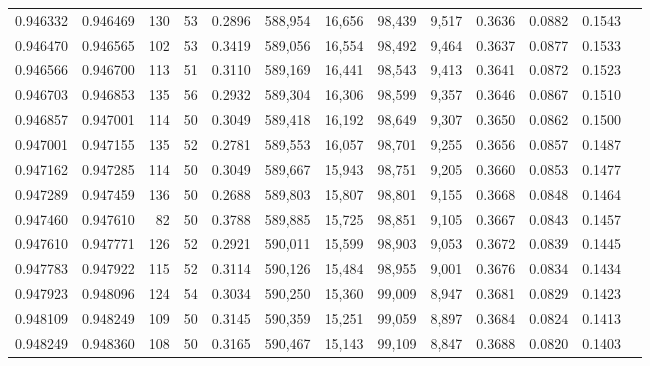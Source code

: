 \begin{tabular}{rrrrrrrrrrrrr}
0.946332 & 0.946469 &   130 &  53 &                                     0.2896 & 588,954 &  16,656 &  98,439 &   9,517 & 0.3636 & 0.0882 & 0.1543 \\
0.946470 & 0.946565 &   102 &  53 &                                     0.3419 & 589,056 &  16,554 &  98,492 &   9,464 & 0.3637 & 0.0877 & 0.1533 \\
0.946566 & 0.946700 &   113 &  51 &                                     0.3110 & 589,169 &  16,441 &  98,543 &   9,413 & 0.3641 & 0.0872 & 0.1523 \\
0.946703 & 0.946853 &   135 &  56 &                                     0.2932 & 589,304 &  16,306 &  98,599 &   9,357 & 0.3646 & 0.0867 & 0.1510 \\
0.946857 & 0.947001 &   114 &  50 &                                     0.3049 & 589,418 &  16,192 &  98,649 &   9,307 & 0.3650 & 0.0862 & 0.1500 \\
0.947001 & 0.947155 &   135 &  52 &                                     0.2781 & 589,553 &  16,057 &  98,701 &   9,255 & 0.3656 & 0.0857 & 0.1487 \\
0.947162 & 0.947285 &   114 &  50 &                                     0.3049 & 589,667 &  15,943 &  98,751 &   9,205 & 0.3660 & 0.0853 & 0.1477 \\
0.947289 & 0.947459 &   136 &  50 &                                     0.2688 & 589,803 &  15,807 &  98,801 &   9,155 & 0.3668 & 0.0848 & 0.1464 \\
0.947460 & 0.947610 &    82 &  50 &                                     0.3788 & 589,885 &  15,725 &  98,851 &   9,105 & 0.3667 & 0.0843 & 0.1457 \\
0.947610 & 0.947771 &   126 &  52 &                                     0.2921 & 590,011 &  15,599 &  98,903 &   9,053 & 0.3672 & 0.0839 & 0.1445 \\
0.947783 & 0.947922 &   115 &  52 &                                     0.3114 & 590,126 &  15,484 &  98,955 &   9,001 & 0.3676 & 0.0834 & 0.1434 \\
0.947923 & 0.948096 &   124 &  54 &                                     0.3034 & 590,250 &  15,360 &  99,009 &   8,947 & 0.3681 & 0.0829 & 0.1423 \\
0.948109 & 0.948249 &   109 &  50 &                                     0.3145 & 590,359 &  15,251 &  99,059 &   8,897 & 0.3684 & 0.0824 & 0.1413 \\
0.948249 & 0.948360 &   108 &  50 &                                     0.3165 & 590,467 &  15,143 &  99,109 &   8,847 & 0.3688 & 0.0820 & 0.1403 \\

\end{tabular}
